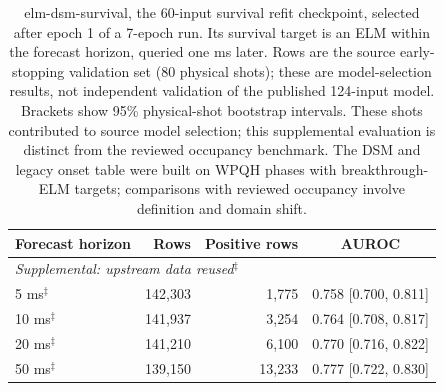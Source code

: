 \begin{table}[t]
\centering
\small
\begin{tabular}{lrrc}
\toprule
Forecast horizon & Rows & Positive rows & AUROC \\
\midrule\multicolumn{4}{l}{\emph{Supplemental: upstream data reused$^{\ddagger}$}} \\
5 ms$^{\ddagger}$ & 142,303 & 1,775 & 0.758 {\scriptsize[0.700, 0.811]} \\
10 ms$^{\ddagger}$ & 141,937 & 3,254 & 0.764 {\scriptsize[0.708, 0.817]} \\
20 ms$^{\ddagger}$ & 141,210 & 6,100 & 0.770 {\scriptsize[0.716, 0.822]} \\
50 ms$^{\ddagger}$ & 139,150 & 13,233 & 0.777 {\scriptsize[0.722, 0.830]} \\
\bottomrule
\end{tabular}\caption{elm-dsm-survival, the 60-input survival refit checkpoint, selected after epoch 1 of a 7-epoch run. Its survival target is an ELM within the forecast horizon, queried one ms later. Rows are the source early-stopping validation set (80 physical shots); these are model-selection results, not independent validation of the published 124-input model. Brackets show 95\% physical-shot bootstrap intervals. These shots contributed to source model selection; this supplemental evaluation is distinct from the reviewed occupancy benchmark. The DSM and legacy onset table were built on WPQH phases with breakthrough-ELM targets; comparisons with reviewed occupancy involve definition and domain shift.}
\label{tab:elm-dsm-own-target}
\end{table}
